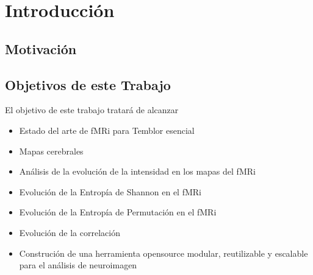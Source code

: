 \chapter{Introducción}

\section{Motivación}


\section{Objetivos de este Trabajo}

El objetivo de este trabajo tratará de alcanzar

\begin{itemize}
\item Estado del arte de fMRi para Temblor esencial
\item Mapas cerebrales
\item Análisis de la evolución de la intensidad en los mapas del fMRi
\item Evolución de la Entropía de Shannon en el fMRi
\item Evolución de la Entropía de Permutación en el fMRi
\item Evolución de la correlación
\item Construción de una herramienta opensource modular, reutilizable y escalable para el análisis de neuroimagen
\end{itemize}


